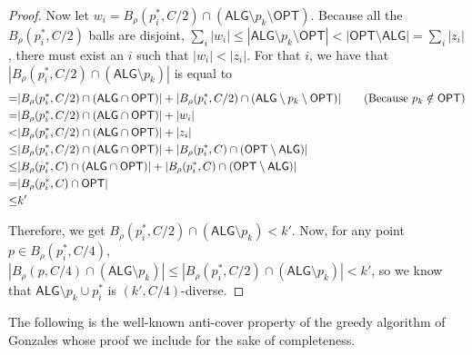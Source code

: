 \begin{proof}
Now let $w_i=B_{\rho}(p^*_i,C/2)\cap (\mathsf{ALG}\setminus p_k\setminus \mathsf{OPT})$. Because all the $B_{\rho}(p^*_i,C/2)$ balls are disjoint, $\sum_i |w_i|\le |\mathsf{ALG}\setminus p_k\setminus \mathsf{OPT}|<|\mathsf{OPT}\setminus \mathsf{ALG}|=\sum_i |z_i|$, there must exist an $i$ such that $|w_i|<|z_i|$. For that $i$, we have that $|B_{\rho}(p^*_i,C/2)\cap (\mathsf{ALG}\setminus p_k)|$ is equal to
\begin{align}
= &|B_{\rho}(p^*_i,C/2)\cap (\mathsf{ALG}\cap \mathsf{OPT})|+|B_{\rho}(p^*_i,C/2)\cap (\mathsf{ALG}\setminus p_k \setminus \mathsf{OPT})|\tag{Because $p_k\notin \mathsf{OPT}$}\\
=&|B_{\rho}(p^*_i,C/2)\cap (\mathsf{ALG}\cap \mathsf{OPT})|+|w_i|\notag \\
<&|B_{\rho}(p^*_i,C/2)\cap (\mathsf{ALG}\cap \mathsf{OPT})|+|z_i|\notag\\
\le&|B_{\rho}(p^*_i,C/2)\cap (\mathsf{ALG}\cap \mathsf{OPT})|+|B_{\rho}(p^*_i,C)\cap (\mathsf{OPT}\setminus\mathsf{ALG})|\notag \\
\le&|B_{\rho}(p^*_i,C)\cap (\mathsf{ALG}\cap \mathsf{OPT})|+|B_{\rho}(p^*_i,C)\cap (\mathsf{OPT}\setminus\mathsf{ALG})|\notag \\
=&|B_{\rho}(p^*_i,C)\cap \mathsf{OPT}|\notag \\
\le&  k'\notag
\end{align}

Therefore, we get $B_{\rho}(p^*_i,C/2)\cap(\mathsf{ALG}\setminus p_k)<k'$. Now, for any point $p\in B_{\rho}(p^*_i,C/4)$, $|B_{\rho}(p,C/4)\cap (\mathsf{ALG}\setminus p_k)|\le |B_{\rho}(p^*_i,C/2)\cap (\mathsf{ALG}\setminus p_k)|<k'$, so we know that $\mathsf{ALG}\setminus p_k\cup p^*_i$ is $(k',C/4)$-diverse.

\end{proof}
The following is the well-known anti-cover property of the greedy algorithm of Gonzales whose proof we include for the sake of completeness.
